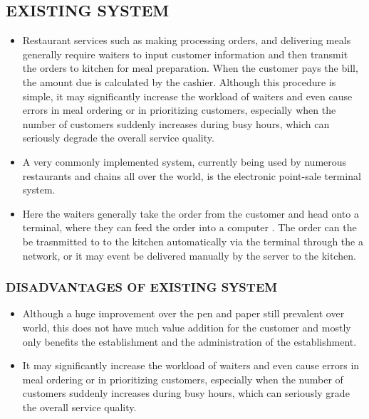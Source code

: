\documentclass[12pt,a4paper]{article}
\begin{document}
	\subsection{EXISTING SYSTEM}
	\begin{itemize}
                \item Restaurant services such as making processing orders, and delivering meals generally require waiters to input customer information and then transmit the orders to kitchen for meal preparation. When the customer pays the bill, the amount due is calculated by the cashier. Although this procedure is simple, it may significantly increase the workload of waiters and even cause errors in meal ordering or in prioritizing customers, especially when the number of customers suddenly increases during busy hours, which can seriously degrade the overall service quality.
                \item A very commonly implemented system, currently being used by numerous restaurants and chains all over the world, is the electronic point-sale terminal system.
                \item Here the waiters generally take the order from the customer and head onto a terminal, where they can feed the order into a computer . The order can the be trasnmitted to to the kitchen automatically via the terminal through the a network, or it may event be delivered manually by the server to the kitchen.
        \end{itemize}

	\subsubsection{DISADVANTAGES OF EXISTING SYSTEM}
	\begin{itemize}
                \item Although a huge improvement over the pen and paper still prevalent over world, this does not have much value addition for the customer and mostly only benefits the establishment and the administration of the establishment.
                \item It may significantly increase the workload of waiters and even cause errors in meal ordering or in prioritizing customers, especially when the number of customers suddenly increases during busy hours, which can seriously grade the overall service quality.
        \end{itemize}
	
	
\end{document}
